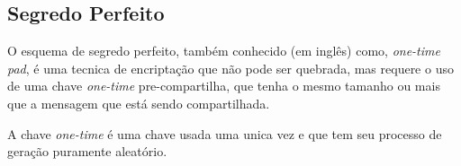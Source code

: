 \documentclass{article}
\begin{document}

\subsection{Segredo Perfeito}%
\label{sub:segredo_perfeito}
O esquema de segredo perfeito, também conhecido (em inglês) como, \textit{
one-time pad}, é uma tecnica de encriptação que não pode ser quebrada, mas
requere o uso de uma chave \textit{one-time} pre-compartilha, que tenha o mesmo
tamanho ou mais que a mensagem que está sendo compartilhada.

A chave \textit{one-time} é uma chave usada uma unica vez e que tem seu
processo de geração puramente aleatório.





\end{document}
